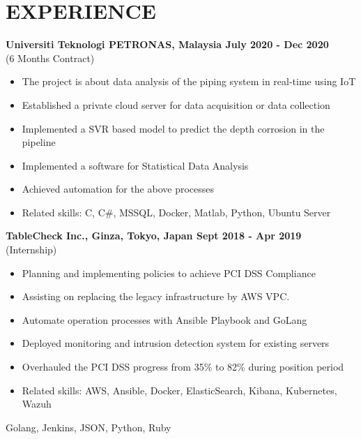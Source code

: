 \vspace{0.3cm}
\section{EXPERIENCE}

\textbf{Universiti Teknologi PETRONAS, Malaysia
\hfill{July 2020 - Dec 2020}} \vspace{0.1cm} \\
 {(6 Months Contract)} \vspace{0.15cm}
    \begin{itemize}
        \item The project is about data analysis of the piping system in real-time using IoT
        \item Established a private cloud server for data acquisition or data collection
        \item Implemented a SVR based model to predict the depth corrosion in the pipeline
        \item Implemented a software for Statistical Data Analysis 
        \item Achieved automation for the above processes
        \item Related skills: C, C\#, MSSQL, Docker, Matlab, Python, Ubuntu Server
    \end{itemize}
    
\textbf{TableCheck Inc., Ginza, Tokyo, Japan 
\hfill{Sept 2018 - Apr 2019}} \vspace{0.1cm} \\
 {(Internship)} \vspace{-0.3cm} \\
    \begin{itemize}
        \item Planning and implementing policies to achieve PCI DSS Compliance
        \item Assisting on replacing the legacy infrastructure by AWS VPC.
        \item Automate operation processes with Ansible Playbook and GoLang
        \item Deployed monitoring and intrusion detection system for existing servers
        \item Overhauled the PCI DSS progress from 35\% to 82\% during position period
        \item Related skills: AWS, Ansible, Docker, ElasticSearch, Kibana, Kubernetes, Wazuh
    \end{itemize}
        \vspace{-0.35cm}\qquad \qquad \qquad \qquad \quad 
        Golang, Jenkins, JSON, Python, Ruby

